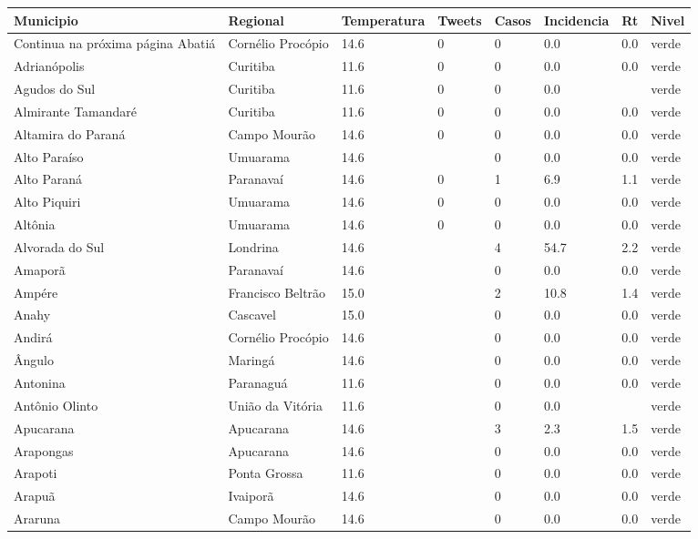\begin{longtable}{l|lllllll}
  \hline
Municipio & Regional & Temperatura & Tweets & Casos & Incidencia & Rt & Nivel \\ 
  \hline
\endhead
\hline
{\footnotesize Continua na próxima página}
\endfoot
\endlastfoot
Abatiá & Cornélio Procópio & 14.6 & 0 & 0 & 0.0 & 0.0 & verde \\ 
  Adrianópolis & Curitiba & 11.6 & 0 & 0 & 0.0 & 0.0 & verde \\ 
  Agudos do Sul & Curitiba & 11.6 & 0 & 0 & 0.0 &  & verde \\ 
  Almirante Tamandaré & Curitiba & 11.6 & 0 & 0 & 0.0 & 0.0 & verde \\ 
  Altamira do Paraná & Campo Mourão & 14.6 & 0 & 0 & 0.0 & 0.0 & verde \\ 
  Alto Paraíso & Umuarama & 14.6 &  & 0 & 0.0 & 0.0 & verde \\ 
  Alto Paraná & Paranavaí & 14.6 & 0 & 1 & 6.9 & 1.1 & verde \\ 
  Alto Piquiri & Umuarama & 14.6 & 0 & 0 & 0.0 & 0.0 & verde \\ 
  Altônia & Umuarama & 14.6 & 0 & 0 & 0.0 & 0.0 & verde \\ 
  Alvorada do Sul & Londrina & 14.6 &  & 4 & 54.7 & 2.2 & verde \\ 
  Amaporã & Paranavaí & 14.6 &  & 0 & 0.0 & 0.0 & verde \\ 
  Ampére & Francisco Beltrão & 15.0 &  & 2 & 10.8 & 1.4 & verde \\ 
  Anahy & Cascavel & 15.0 &  & 0 & 0.0 & 0.0 & verde \\ 
  Andirá & Cornélio Procópio & 14.6 &  & 0 & 0.0 & 0.0 & verde \\ 
  Ângulo & Maringá & 14.6 &  & 0 & 0.0 & 0.0 & verde \\ 
  Antonina & Paranaguá & 11.6 &  & 0 & 0.0 & 0.0 & verde \\ 
  Antônio Olinto & União da Vitória & 11.6 &  & 0 & 0.0 &  & verde \\ 
  Apucarana & Apucarana & 14.6 &  & 3 & 2.3 & 1.5 & verde \\ 
  Arapongas & Apucarana & 14.6 &  & 0 & 0.0 & 0.0 & verde \\ 
  Arapoti & Ponta Grossa & 11.6 &  & 0 & 0.0 & 0.0 & verde \\ 
  Arapuã & Ivaiporã & 14.6 &  & 0 & 0.0 & 0.0 & verde \\ 
  Araruna & Campo Mourão & 14.6 &  & 0 & 0.0 & 0.0 & verde \\ 

\end{longtable}
